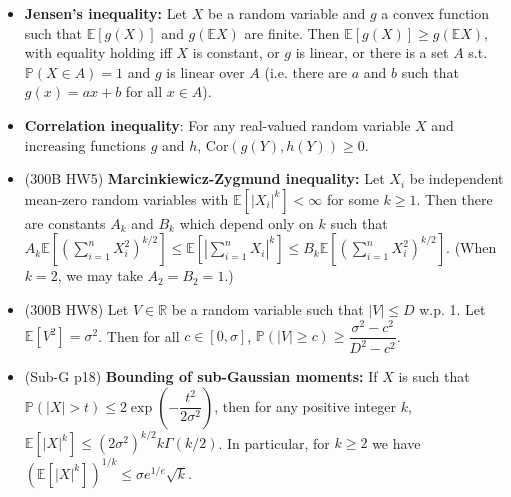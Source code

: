 \documentclass[twoside]{article}
\newcommand{\dis}{\displaystyle}
\newcommand\bbE{\mathbb{E}}
\newcommand\bbP{\mathbb{P}}
\newcommand\bbR{\mathbb{R}}
\newcommand\sg{\sigma}
\begin{document}
\begin{itemize}
\item \textbf{Jensen's inequality:} Let $X$ be a random variable and $g$ a convex function such that $\bbE [g(X)]$ and $g(\bbE X)$ are finite. Then $\bbE [g(X)] \geq g(\bbE X)$, with equality holding iff $X$ is constant, or $g$ is linear, or there is a set $A$ s.t. $\bbP (X \in A) = 1$ and $g$ is linear over $A$ (i.e. there are $a$ and $b$ such that $g(x) = ax + b$ for all $x \in A$).

\item \textbf{Correlation inequality}: For any real-valued random variable $X$ and increasing functions $g$ and $h$, $\text{Cor} (g(Y), h(Y)) \geq 0$.

\item (300B HW5) \textbf{Marcinkiewicz-Zygmund inequality:} Let $X_i$ be independent mean-zero random variables with $\bbE [|X_i|^k] < \infty$ for some $k \geq 1$. Then there are constants $A_k$ and $B_k$ which depend only on $k$ such that $A_k \bbE \left[ \left( \dis\sum_{i=1}^n X_i^2 \right)^{k/2} \right] \leq \bbE \left[ \left| \dis\sum_{i=1}^n X_i \right|^k \right] \leq B_k \bbE \left[ \left( \dis\sum_{i=1}^n X_i^2 \right)^{k/2} \right]$. (When $k = 2$, we may take $A_2 = B_2 = 1$.)

\item (300B HW8) Let $V \in \bbR$ be a random variable such that $|V| \leq D$ w.p. 1. Let $\bbE [V^2] = \sg^2$. Then for all $c \in [0, \sg]$, $\bbP (|V| \geq c) \geq \dfrac{\sg^2 - c^2}{D^2 - c^2}$.

\item (Sub-G p18) \textbf{Bounding of sub-Gaussian moments:} If $X$ is such that $\bbP (|X| > t) \leq 2 \exp \left(-\dfrac{t^2}{2\sg^2}\right)$, then for any positive integer $k$, $\bbE [|X|^k] \leq (2\sg^2)^{k/2} k\Gamma(k/2)$. In particular, for $k \geq 2$ we have $(\bbE[|X|^k])^{1/k} \leq \sg e^{1/e}\sqrt{k}$.

\end{itemize}

\end{document}
